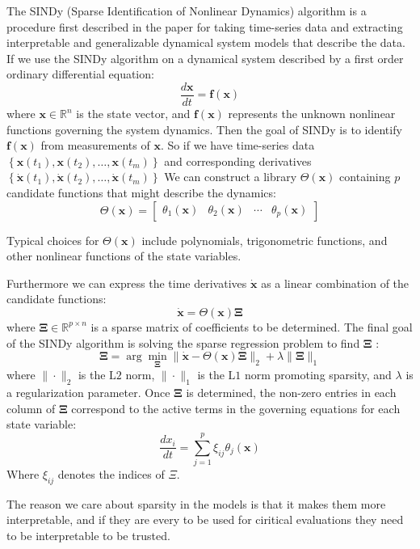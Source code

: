 The SINDy (Sparse Identification of Nonlinear Dynamics) algorithm is a procedure first described in the paper \cite{Brunton_2016} for taking time-series data and extracting interpretable and generalizable dynamical system models that describe the data. If we use the SINDy algorithm on a dynamical system described by a first order ordinary differential equation:
$$
\frac{d \mathbf{x}}{d t}=\mathbf{f}(\mathbf{x})
$$
where $\mathbf{x} \in \mathbb{R}^n$ is the state vector, and $\mathbf{f}(\mathbf{x})$ represents the unknown nonlinear functions governing the system dynamics. Then the goal of SINDy is to identify $\mathbf{f}(\mathbf{x})$ from measurements of $\mathbf{x}$.
So if we have time-series data $\left\{\mathbf{x}\left(t_1\right), \mathbf{x}\left(t_2\right), \ldots, \mathbf{x}\left(t_m\right)\right\}$ and corresponding derivatives $\left\{\dot{\mathbf{x}}\left(t_1\right), \dot{\mathbf{x}}\left(t_2\right), \ldots, \dot{\mathbf{x}}\left(t_m\right)\right\}$ We can construct a library $\Theta(\mathbf{x})$ containing $p$ candidate functions that might describe the dynamics:
$$
\Theta(\mathbf{x})=\left[\begin{array}{llll}
\theta_1(\mathbf{x}) & \theta_2(\mathbf{x}) & \cdots & \theta_p(\mathbf{x})
\end{array}\right]
$$

Typical choices for $\Theta(\mathbf{x})$ include polynomials, trigonometric functions, and other nonlinear functions of the state variables. 

Furthermore we can express the time derivatives $\dot{\mathbf{x}}$ as a linear combination of the candidate functions:
$$
\dot{\mathbf{x}}=\Theta(\mathbf{x}) \boldsymbol{\Xi}
$$
where $\boldsymbol{\Xi} \in \mathbb{R}^{p \times n}$ is a sparse matrix of coefficients to be determined. The final goal of the SINDy algorithm is solving the sparse regression problem to find $\boldsymbol{\Xi}$ :
$$
\boldsymbol{\Xi}=\arg \min _{\boldsymbol{\Xi}}\|\dot{\mathbf{x}}-\Theta(\mathbf{x}) \boldsymbol{\Xi}\|_2+\lambda\|\boldsymbol{\Xi}\|_1
$$
where $\|\cdot\|_2$ is the $\mathrm{L} 2$ norm, $\|\cdot\|_1$ is the $\mathrm{L} 1$ norm promoting sparsity, and $\lambda$ is a regularization parameter. Once $\boldsymbol{\Xi}$ is determined, the non-zero entries in each column of $\boldsymbol{\Xi}$ correspond to the active terms in the governing equations for each state variable:
$$
\frac{d x_i}{d t}=\sum_{j=1}^p \xi_{ij} \theta_j(\mathbf{x})
$$
Where $\xi_{ij}$ denotes the indices of $\Xi$.

The reason we care about sparsity in the models is that it makes them more interpretable, and if they are every to be used for ciritical evaluations they need to be interpretable to be trusted.

